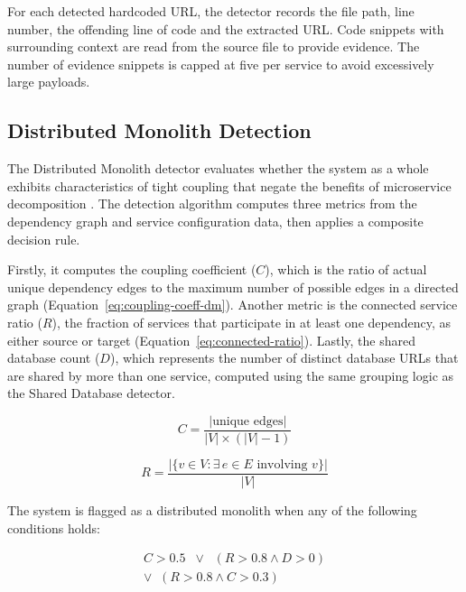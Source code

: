 For each detected hardcoded URL, the detector records the file path, line number, the offending line of code and the extracted URL. Code snippets with surrounding context are read from the source file to provide evidence. The number of evidence snippets is capped at five per service to avoid excessively large payloads.

\subsection{Distributed Monolith Detection}
\label{subsec:detect-distributed-monolith}

\par The Distributed Monolith detector evaluates whether the system as a whole exhibits characteristics of tight coupling that negate the benefits of microservice decomposition \cite{Newman2015, Richards2015}. The detection algorithm computes three metrics from the dependency graph and service configuration data, then applies a composite decision rule.

\par Firstly, it computes the coupling coefficient ($C$), which is the ratio of actual unique dependency edges to the maximum number of possible edges in a directed graph (Equation~\ref{eq:coupling-coeff-dm}).
Another metric is the connected service ratio ($R$), the fraction of services that participate in at least one dependency, as either source or target (Equation~\ref{eq:connected-ratio}).
Lastly, the shared database count ($D$), which represents the number of distinct database URLs that are shared by more than one service, computed using the same grouping logic as the Shared Database detector.

\begin{equation}
    C = \frac{|\text{unique edges}|}{|V| \times (|V| - 1)}
    \label{eq:coupling-coeff-dm}
\end{equation}

\begin{equation}
    R = \frac{\bigl|\{v \in V : \exists\, e \in E \text{ involving } v\}\bigr|}{|V|}
    \label{eq:connected-ratio}
\end{equation}

The system is flagged as a distributed monolith when any of the following conditions holds:

\begin{equation}
    \begin{array}{c}
        C > 0.5 \;\;\vee\;\; (R > 0.8 \wedge D > 0) \\[4pt]
        \vee\;\; (R > 0.8 \wedge C > 0.3)
    \end{array}
    \label{eq:dm-decision-rule}
\end{equation}

